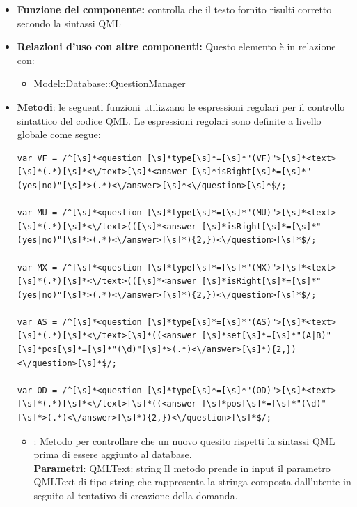 \begin{itemize}
\item\textbf{Funzione del componente:} controlla che il testo fornito risulti corretto secondo la sintassi QML
\item\textbf{Relazioni d'uso con altre componenti:} 
Questo elemento è in relazione con:
\begin{itemize}
\item Model::Database::QuestionManager\\
\end{itemize}
\item\textbf{Metodi}:
le seguenti funzioni utilizzano le espressioni regolari per il controllo sintattico del codice QML.
Le espressioni regolari sono definite a livello globale come segue:\\
\begin{lstlisting}
var VF = /^[\s]*<question [\s]*type[\s]*=[\s]*"(VF)">[\s]*<text>[\s]*(.*)[\s]*<\/text>[\s]*<answer [\s]*isRight[\s]*=[\s]*"(yes|no)"[\s]*>(.*)<\/answer>[\s]*<\/question>[\s]*$/;

var MU = /^[\s]*<question [\s]*type[\s]*=[\s]*"(MU)">[\s]*<text>[\s]*(.*)[\s]*<\/text>(([\s]*<answer [\s]*isRight[\s]*=[\s]*"(yes|no)"[\s]*>(.*)<\/answer>[\s]*){2,})<\/question>[\s]*$/;

var MX = /^[\s]*<question [\s]*type[\s]*=[\s]*"(MX)">[\s]*<text>[\s]*(.*)[\s]*<\/text>(([\s]*<answer [\s]*isRight[\s]*=[\s]*"(yes|no)"[\s]*>(.*)<\/answer>[\s]*){2,})<\/question>[\s]*$/;

var AS = /^[\s]*<question [\s]*type[\s]*=[\s]*"(AS)">[\s]*<text>[\s]*(.*)[\s]*<\/text>[\s]*((<answer [\s]*set[\s]*=[\s]*"(A|B)" [\s]*pos[\s]*=[\s]*"(\d)"[\s]*>(.*)<\/answer>[\s]*){2,})<\/question>[\s]*$/;

var OD = /^[\s]*<question [\s]*type[\s]*=[\s]*"(OD)">[\s]*<text>[\s]*(.*)[\s]*<\/text>[\s]*((<answer [\s]*pos[\s]*=[\s]*"(\d)"[\s]*>(.*)<\/answer>[\s]*){2,})<\/question>[\s]*$/;

\end{lstlisting}
\newpage
	\begin{itemize}
		\item{} : Metodo per controllare che un nuovo quesito rispetti la sintassi QML prima di essere aggiunto al database.\\
		\textbf{Parametri}: QMLText: string
		Il metodo prende in input il parametro QMLText di tipo string che rappresenta la stringa composta dall'utente in seguito al tentativo di creazione della domanda.
		

\end{itemize}
\end{itemize}

